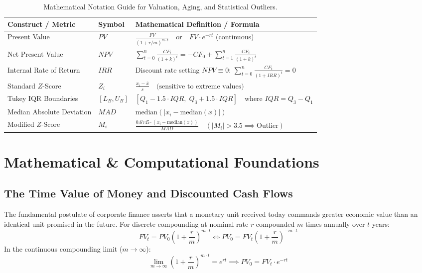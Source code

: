 \begin{table}[htbp]
\centering
\small
\begin{tabularx}{\textwidth}{llX}
\toprule
\textbf{Construct / Metric} & \textbf{Symbol} & \textbf{Mathematical Definition / Formula} \\
\midrule
Present Value & $PV$ & $\frac{FV}{(1 + r/m)^{m \cdot t}} \quad \text{or} \quad FV \cdot e^{-rt}$ (continuous) \\
Net Present Value & $NPV$ & $\sum_{t=0}^n \frac{CF_t}{(1 + k)^t} = -CF_0 + \sum_{t=1}^n \frac{CF_t}{(1 + k)^t}$ \\
Internal Rate of Return & $IRR$ & Discount rate setting $NPV \equiv 0$: $\sum_{t=0}^n \frac{CF_t}{(1 + IRR)^t} = 0$ \\
Standard $Z$-Score & $Z_i$ & $\frac{x_i - \bar{x}}{s} \quad \text{(sensitive to extreme values)}$ \\
Tukey IQR Boundaries & $[L_B, U_B]$ & $[Q_1 - 1.5 \cdot IQR, \; Q_3 + 1.5 \cdot IQR] \quad \text{where } IQR = Q_3 - Q_1$ \\
Median Absolute Deviation & $MAD$ & $\text{median}\left(|x_i - \text{median}(x)|\right)$ \\
Modified $Z$-Score & $M_i$ & $\frac{0.6745 \cdot (x_i - \text{median}(x))}{MAD} \quad (|M_i| > 3.5 \implies \text{Outlier})$ \\
\bottomrule
\end{tabularx}
\caption{Mathematical Notation Guide for Valuation, Aging, and Statistical Outliers.}
\label{tab:w6_notation}
\end{table}

\section{Mathematical \& Computational Foundations}

\subsection{The Time Value of Money and Discounted Cash Flows}
The fundamental postulate of corporate finance asserts that a monetary unit received today commands greater economic value than an identical unit promised in the future. For discrete compounding at nominal rate $r$ compounded $m$ times annually over $t$ years:
\begin{equation}
FV_t = PV_0 \left(1 + \frac{r}{m}\right)^{m \cdot t} \iff PV_0 = FV_t \left(1 + \frac{r}{m}\right)^{-m \cdot t}
\label{eq:tvm_discrete}
\end{equation}
In the continuous compounding limit ($m \to \infty$):
\begin{equation}
\lim_{m \to \infty} \left(1 + \frac{r}{m}\right)^{m \cdot t} = e^{rt} \implies PV_0 = FV_t \cdot e^{-rt}
\label{eq:tvm_continuous}
\end{equation}

